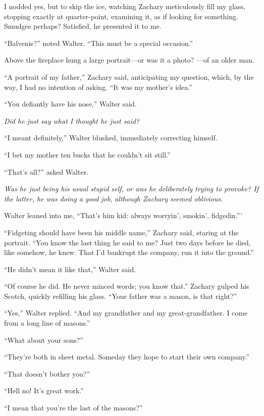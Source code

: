 I nodded yes, but to skip the ice, watching Zachary meticulously fill my
glass, stopping exactly at quarter-point, examining it, as if looking
for something. Smudges perhaps? Satisfied, he presented it to me.

``Balvenie?'' noted Walter. ``This must be a special occasion.''

Above the fireplace hung a large portrait---or was it a photo? ---of an
older man.

``A portrait of my father,'' Zachary said, anticipating my question,
which, by the way, I had no intention of asking. ``It was my mother's
idea.''

``You defiantly have his nose,'' Walter said.

\emph{Did he just say what I thought he just said?}

``I meant definitely,'' Walter blushed, immediately correcting himself.

``I bet my mother ten bucks that he couldn't sit still.''

``That's all?'' asked Walter.

\emph{Was he just being his usual stupid self, or was he deliberately
trying to provoke? If the latter, he was doing a good job,}
\emph{although Zachary seemed oblivious.}

Walter leaned into me, ``That's him kid: always worryin', smokin',
fidgedin.'''

``Fidgeting should have been his middle name,'' Zachary said, staring at
the portrait. ``You know the last thing he said to me? Just two days
before he died, like somehow, he knew. That I'd bankrupt the company,
run it into the ground.''

``He didn't mean it like that,'' Walter said.

``Of course he did. He never minced words; you know that.'' Zachary
gulped his Scotch, quickly refilling his glass. ``Your father was a
mason, is that right?''

``Yes,'' Walter replied. ``And my grandfather and my great-grand\-fa\-ther.
I come from a long line of masons.''

``What about your sons?''

``They're both in sheet metal. Someday they hope to start their own
company.''

``That doesn't bother you?''

``Hell no! It's great work.''

``I mean that you're the last of the masons?''

